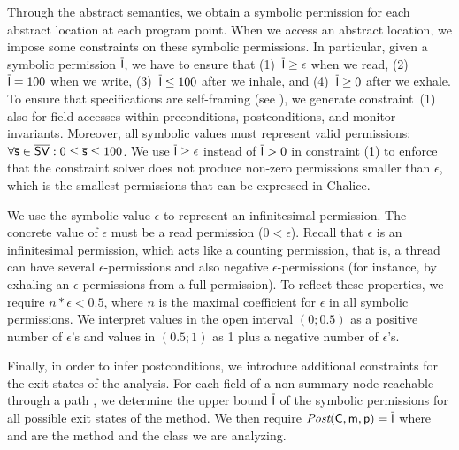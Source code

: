 \documentclass{llncs}
\begin{document}
Through the abstract semantics, we obtain a symbolic permission for
each abstract location at each program point. When we access an
abstract location, we impose some constraints on these symbolic
permissions. In particular, given a symbolic permission $\mathsf{\overline{l}}$, we
have to ensure that (1)~$\mathsf{\overline{l}} \geq \epsilon$ when we read,
(2)~$\mathsf{\overline{l}} = 100$ when we write, (3)~$\mathsf{\overline{l}} \leq 100$ after we
inhale, and (4)~$\mathsf{\overline{l}} \geq 0$ after we exhale.
To ensure that specifications are self-framing (see ), we generate
constraint~(1) also for field accesses within preconditions, 
postconditions, and monitor invariants.
Moreover, all symbolic values must represent valid permissions:
$\forall \mathsf{\overline{s}} \in \mathsf{\overline{SV}} : 0
\leq \mathsf{\overline{s}} \leq 100$.
We use $\mathsf{\overline{l}} \geq \epsilon$ instead of $\mathsf{\overline{l}} > 0$ in constraint (1) to enforce that the constraint solver does not produce non-zero permissions smaller than $\epsilon$, which is the smallest permissions that can be expressed in Chalice.


We use the symbolic value $\epsilon$ to represent an infinitesimal
permission. The concrete value of $\epsilon$ must be a read permission
($0< \epsilon$). Recall that $\epsilon$ is an infinitesimal
permission, which acts like a counting permission, that is, a thread
can have several $\epsilon$-permissions and also negative
$\epsilon$-permissions (for instance, by exhaling an
$\epsilon$-permissions from a full permission). To reflect these
properties, we require $n*\epsilon < 0.5$, where $n$ is the maximal
coefficient for $\epsilon$ in all symbolic permissions. We interpret values in the open interval $(0;0.5)$ as
a positive number of $\epsilon$'s and values in $(0.5;1)$ as 1 plus a
negative number of $\epsilon$'s.


Finally, in order to infer postconditions, we introduce additional
constraints for the exit states of the analysis.  For each field of a
non-summary node reachable through a path , we determine
the upper bound $\mathsf{\overline{l}}$ of the symbolic permissions for all possible exit
states of the method.  We then require
$\textit{Post}(\mathsf{C}, \mathsf{m}, \mathsf{p})=\mathsf{\overline{l}}$ where  and  are
the method and the class we are analyzing.
\end{document}
